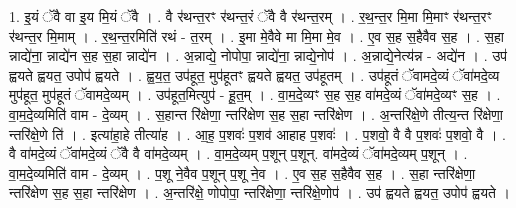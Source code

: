\documentclass[17pt]{extarticle}
\begin{document}
1. इ॒यं ॅवै वा इ॒य मि॒यं ॅवै । . वै र॑थन्त॒रꣳ र॑थन्त॒रं ॅवै वै र॑थन्त॒रम् । . र॒थ॒न्त॒र मि॒मा मि॒माꣳ र॑थन्त॒रꣳ र॑थन्त॒र मि॒माम् । . र॒थ॒न्त॒रमिति॑ रथं - त॒रम् । . इ॒मा मे॒वैवे मा मि॒मा मे॒व । . ए॒व स॒ह स॒हैवैव स॒ह । . स॒हा न्नाद्ये॑ना॒ न्नाद्ये॑न स॒ह स॒हा न्नाद्ये॑न । . अ॒न्नाद्ये॒ नोपोपा॒ न्नाद्ये॑ना॒ न्नाद्ये॒नोप॑ । . अ॒न्नाद्ये॒नेत्य॑न्न - अद्ये॑न । . उप॑ ह्वयते ह्वयत॒ उपोप॑ ह्वयते । . ह्व॒य॒त॒ उप॑हूत॒ मुप॑हूतꣳ ह्वयते ह्वयत॒ उप॑हूतम् । . उप॑हूतं ॅवामदे॒व्यं ॅवा॑मदे॒व्य मुप॑हूत॒ मुप॑हूतं ॅवामदे॒व्यम् । . उप॑हूत॒मित्युप॑ - हू॒त॒म् । . वा॒म॒दे॒व्यꣳ स॒ह स॒ह वा॑मदे॒व्यं ॅवा॑मदे॒व्यꣳ स॒ह । . वा॒म॒दे॒व्यमिति॑ वाम - दे॒व्यम् । . स॒हान्त रि॑क्षेणा॒ न्तरि॑क्षेण स॒ह स॒हा न्तरि॑क्षेण । . अ॒न्तरि॑क्षे॒णे तीत्य॒न्त रि॑क्षेणा॒ न्तरि॑क्षे॒णे ति॑ । . इत्या॑हा॒हे तीत्या॑ह । . आ॒ह॒ प॒शवः॑ प॒शव॑ आहाह प॒शवः॑ । . प॒शवो॒ वै वै प॒शवः॑ प॒शवो॒ वै । . वै वा॑मदे॒व्यं ॅवा॑मदे॒व्यं ॅवै वै वा॑मदे॒व्यम् । . वा॒म॒दे॒व्यम् प॒शून् प॒शून्. वा॑मदे॒व्यं ॅवा॑मदे॒व्यम् प॒शून् । . वा॒म॒दे॒व्यमिति॑ वाम - दे॒व्यम् । . प॒शू ने॒वैव प॒शून् प॒शू ने॒व । . ए॒व स॒ह स॒हैवैव स॒ह । . स॒हा न्तरि॑क्षेणा॒ न्तरि॑क्षेण स॒ह स॒हा न्तरि॑क्षेण । . अ॒न्तरि॑क्षे॒ णोपोपा॒ न्तरि॑क्षेणा॒ न्तरि॑क्षे॒णोप॑ । . उप॑ ह्वयते ह्वयत॒ उपोप॑ ह्वयते । \newline
\end{document}
